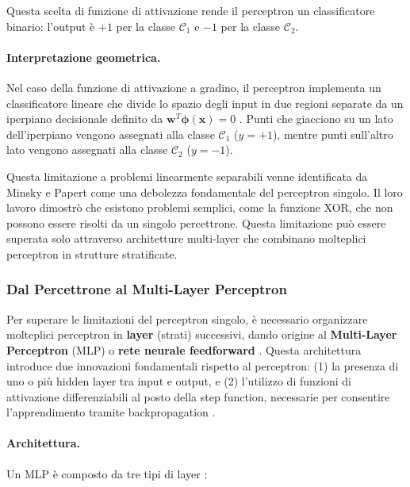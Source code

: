 Questa scelta di funzione di attivazione rende il perceptron un classificatore binario: l'output è $+1$ per la classe $\mathcal{C}_1$ e $-1$ per la classe $\mathcal{C}_2$.

\paragraph{Interpretazione geometrica.} Nel caso della funzione di attivazione a gradino, il perceptron implementa un classificatore lineare che divide lo spazio degli input in due regioni separate da un iperpiano decisionale definito da $\mathbf{w}^T \boldsymbol{\phi}(\mathbf{x}) = 0$ \cite{bishop2006pattern}. Punti che giacciono su un lato dell'iperpiano vengono assegnati alla classe $\mathcal{C}_1$ ($y = +1$), mentre punti sull'altro lato vengono assegnati alla classe $\mathcal{C}_2$ ($y = -1$).

Questa limitazione a problemi linearmente separabili venne identificata da Minsky e Papert \cite{minsky1969perceptrons} come una debolezza fondamentale del perceptron singolo. Il loro lavoro dimostrò che esistono problemi semplici, come la funzione XOR, che non possono essere risolti da un singolo percettrone. Questa limitazione può essere superata solo attraverso architetture multi-layer che combinano molteplici perceptron in strutture stratificate.

\subsubsection{Dal Percettrone al Multi-Layer Perceptron}
\label{sec:MLP}

Per superare le limitazioni del perceptron singolo, è necessario organizzare mol\-te\-pli\-ci perceptron in \textbf{layer} (strati) successivi, dando origine al \textbf{Multi-Layer Perceptron} (MLP) o \textbf{rete neurale feedforward} \cite{goodfellow2016deep}. Questa architettura introduce due innovazioni fondamentali rispetto al perceptron: (1) la presenza di uno o più hidden layer tra input e output, e (2) l'utilizzo di funzioni di attivazione differenziabili al posto della step function, necessarie per consentire l'apprendimento tramite backpropagation \cite{rumelhart1986learning}.


\paragraph{Architettura.} Un MLP è composto da tre tipi di layer \cite{bishop2006pattern, goodfellow2016deep}:

